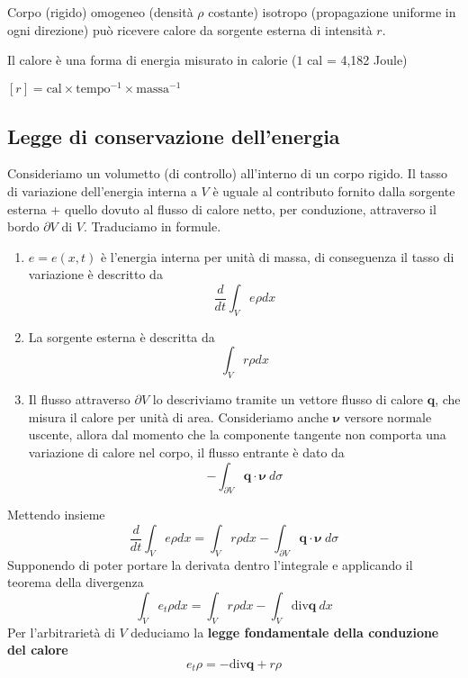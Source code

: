 \documentclass[10pt,a4paper,twoside,openright]{book}
\begin{document}
Corpo (rigido) omogeneo (densità $\rho $ costante) isotropo (propagazione uniforme in ogni direzione) può ricevere calore da sorgente esterna di intensità $r$.



Il calore è una forma di energia misurato in calorie ($1$ cal = 4,182 Joule)

$[ r] =\text{cal} \times \text{tempo}^{-1} \times \text{massa}^{-1}$
\subsection{Legge di conservazione dell'energia}

Consideriamo un volumetto (di controllo) all'interno di un corpo rigido. Il tasso di variazione dell'energia interna a $V$ è uguale al contributo fornito dalla sorgente esterna + quello dovuto al flusso di calore netto, per conduzione, attraverso il bordo $\partial V$ di $V$. Traduciamo in formule.
\begin{enumerate}
\item $e=e(x,t)$ è l'energia interna per unità di massa, di conseguenza il tasso di variazione è descritto da\begin{equation*}
\frac{d}{dt}\int _{V} e\rho dx
\end{equation*}
\item La sorgente esterna è descritta da\begin{equation*}
\int _{V} r\rho dx
\end{equation*}
\item Il flusso attraverso $\partial V$ lo descriviamo tramite un vettore flusso di calore $\mathbf{q}$, che misura il calore per unità di area. Consideriamo anche $\displaystyle \bm{\nu}$ versore normale uscente, allora dal momento che la componente tangente non comporta una variazione di calore nel corpo, il flusso entrante è dato da\begin{equation*}
-\int _{\partial V}\mathbf{q} \cdotp \bm{\nu} \ d\sigma 
\end{equation*}
\end{enumerate}

Mettendo insieme
\begin{equation*}
\frac{d}{dt}\int _{V} e\rho dx=\int _{V} r\rho dx-\int _{\partial V}\mathbf{q} \cdotp \bm{\nu} \ d\sigma 
\end{equation*}
Supponendo di poter portare la derivata dentro l'integrale e applicando il teorema della divergenza
\begin{equation*}
\int _{V} e_{t} \rho dx=\int _{V} r\rho dx-\int _{V}\mathrm{div}\mathbf{q} \ dx
\end{equation*}
Per l'arbitrarietà di $\displaystyle V$ deduciamo la \textbf{legge fondamentale della conduzione del calore}
\begin{equation*}
\boxed{e_{t} \rho =-\mathrm{div}\mathbf{q} +r\rho }
\end{equation*}
\end{document}
